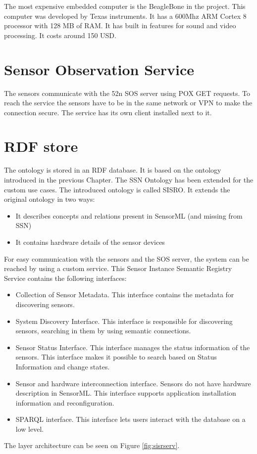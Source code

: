 The most expensive embedded computer is the BeagleBone in the project. This computer was developed by Texas instruments. It has a 600Mhz ARM Cortex 8 processor with 128 MB of RAM. It has built in features for sound and video processing. It costs around 150 USD. 


\section{Sensor Observation Service}

The sensors communicate with the 52n SOS server using POX GET requests. To reach the service the sensors have to be in the same network or VPN to make the connection secure. The service has its own client installed next to it.

\section{RDF store\label{sec:rdfstore}}

The ontology is stored in an RDF database. It is based on the ontology introduced in the previous Chapter. The SSN Ontology has been extended for the custom use cases. The introduced ontology is called SISRO. It extends the original ontology in two ways:
\begin{itemize}
	\item It describes concepts and relations present in SensorML (and missing from SSN)
	\item It contains hardware details of the sensor devices
\end{itemize}


For easy communication with the sensors and the SOS server, the system can be reached by using a custom service.
This Sensor Instance Semantic Registry Service contains the following interfaces:
\begin{itemize}
	\item Collection of Sensor Metadata. This interface contains the metadata for discovering sensors.
	\item System Discovery Interface. This interface is responsible for discovering sensors, searching in them by using semantic connections.
	\item Sensor Status Interface. This interface manages the status information of the sensors. This interface makes it possible to search based on Status Information and change states.
	\item Sensor and hardware interconnection interface. Sensors do not have hardware description in SensorML. This interface supports application installation information and reconfiguration.
	\item SPARQL interface. This interface lets users interact with the database on a low level.	  
\end{itemize}
The layer architecture can be seen on Figure \ref{fig:sisrserv}.	

